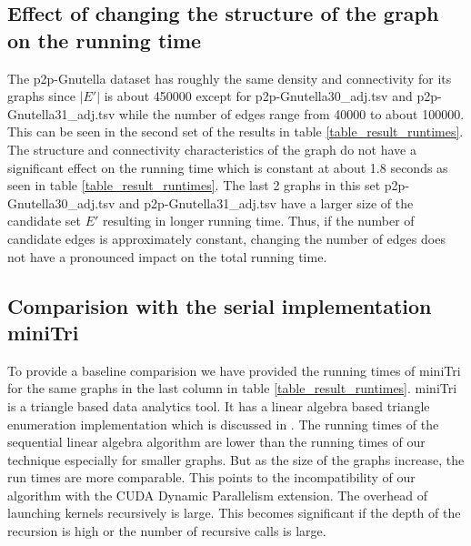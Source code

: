 \documentclass[conference]{IEEEtran}
\begin{document}
\subsection{Effect of changing the structure of the graph on the running time}
The p2p-Gnutella dataset has roughly the same density and connectivity for its graphs since $|E'|$ is about 450000 except for p2p-Gnutella30\_adj.tsv and p2p-Gnutella31\_adj.tsv while the number of edges range from 40000 to about 100000. This can be seen in the second set of the results in table \ref{table_result_runtimes}. The structure and connectivity characteristics of the graph do not have a significant effect on the running time which is constant at about 1.8 seconds as seen in table \ref{table_result_runtimes}. The last 2 graphs in this set p2p-Gnutella30\_adj.tsv and p2p-Gnutella31\_adj.tsv have a larger size of the candidate set $E'$ resulting in longer running time. Thus, if the number of candidate edges is approximately constant, changing the number of edges does not have a pronounced impact on the total running time. 

\subsection{Comparision with the serial implementation miniTri}
To provide a baseline comparision we have provided the running times of miniTri for the same graphs in the last column in table \ref{table_result_runtimes}. miniTri is a triangle based data analytics tool. It has a linear algebra based triangle enumeration implementation which is discussed in \cite{b22}. The running times of the sequential linear algebra algorithm are lower than the running times of our technique especially for smaller graphs. But as the size of the graphs increase, the run times are more comparable. This points to the incompatibility of our algorithm with the CUDA Dynamic Parallelism extension\cite{b21}. The overhead of launching kernels recursively is large. This becomes significant if the depth of the recursion is high or the number of recursive calls is large.
\end{document}
